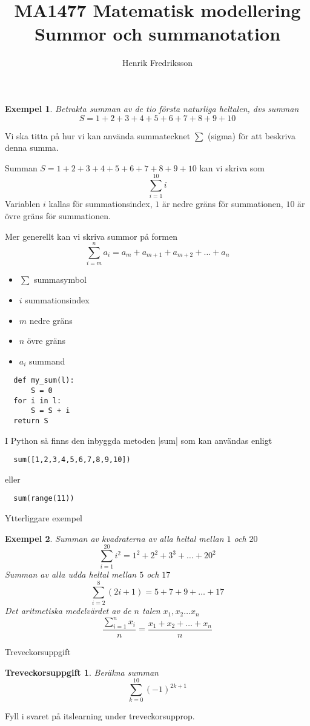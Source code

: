 \documentclass{beamer}
\author{Henrik Fredriksson}
\institute{Blekinge Tekniska Högskola}
\title{MA1477 Matematisk modellering \\ Summor och summanotation}
\newtheorem{exempel}{Exempel}
\newtheorem{tre}{Treveckorsuppgift}
\begin{document}
\maketitle

\begin{frame}
\begin{exempel}
  Betrakta summan av de tio första naturliga heltalen, dvs summan
\[
S = 1+2+3 + 4 + 5 + 6 + 7 + 8 + 9 + 10
\]
\end{exempel}
\pause
Vi ska titta på hur vi kan använda summatecknet $\sum$ (sigma) för att
beskriva denna summa.

\pause
Summan $S = 1+2+3+4+5+6+7+8+9+10$ kan vi skriva som
\[
\sum_{i = 1}^{10} i
\]
\pause
Variablen $i$ kallas för summationsindex, $1$ är nedre gräns för
summationen, $10$ är övre gräns för summationen.
\end{frame}


\begin{frame}

Mer generellt kan vi skriva summor på formen
\[
\sum_{i = m}^n a_i = a_m + a_{m+1} + a_{m+2} + \ldots + a_n
\]

\begin{itemize}
\item $\sum$ summasymbol
\item $i$ summationsindex
\item $m$ nedre gräns
\item $n$ övre gräns
\item $a_i$ summand
\end{itemize}
\end{frame}


\begin{frame}[fragile]
\begin{verbatim}
  def my_sum(l):
      S = 0
  for i in l:
      S = S + i
  return S
\end{verbatim}


  I Python så finns den inbyggda metoden |sum|
  som kan användas enligt
\begin{verbatim}
  sum([1,2,3,4,5,6,7,8,9,10])
\end{verbatim}
eller
\begin{verbatim}
  sum(range(11))
\end{verbatim}
\end{frame}

\begin{frame}{Ytterliggare exempel}
  \begin{exempel}
    Summan av kvadraterna av alla heltal mellan $1$ och $20$
    \[
      \sum_{i = 1}^{20} i^2 = 1^2 + 2^2+3^3 + \ldots + 20^2
    \]
    \pause
    Summan av alla udda heltal mellan $5$ och $17$
    \[
      \sum_{i = 2}^{8} (2i +1) = 5+ 7 + 9 +\ldots + 17
    \] 
    \pause
    Det aritmetiska medelvärdet av de $n$ talen $x_1, x_2 \ldots x_n$
    \[
      \dfrac{\sum_{i=1}^n x_i}{n} = \dfrac{x_1 + x_2 + \ldots + x_n}{n}
    \]

  \end{exempel}
\end{frame}

\begin{frame}{Treveckorsuppgift}

  \begin{tre}
    Beräkna summan
    \[
      \sum_{k = 0}^{10} (-1)^{2k+1}
    \]
  \end{tre}
  Fyll i svaret på itslearning under treveckorsupprop.
\end{frame}
\end{document}
